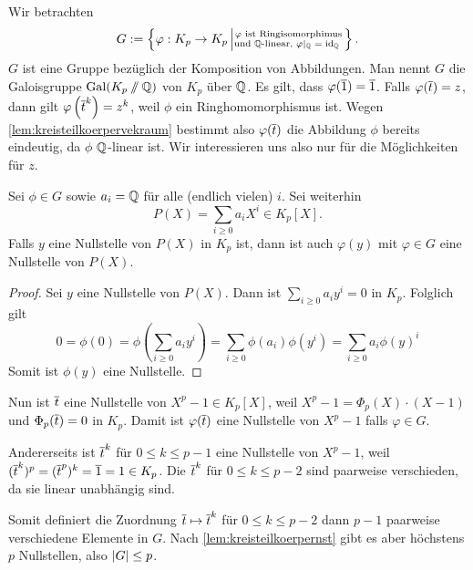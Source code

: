 \documentclass[12pt,a4paper]{scrartcl}
\begin{document}
Wir betrachten 
\begin{equation*}
	G := \left\lbrace \varphi: K_p \to K_p \left| \substack{\text{$\varphi$ ist Ringisomorphimus} \\ \text{und $\mathbb Q$-linear, $\varphi|_\mathbb Q = \operatorname{id}_\mathbb Q$ }}\right. \right\rbrace .
\end{equation*}
$G$ ist eine Gruppe bezüglich der Komposition von Abbildungen. Man nennt $G$ die Galoisgruppe $\operatorname{Gal}(K_p \sslash \mathbb Q)$ von $K_p$ über $\mathbb Q$.
Es gilt, dass $\varphi(\overline{1}) = \overline{1}$. Falls $\varphi(\overline{t}) = z$, dann gilt $\varphi\left( \overline{t} ^k \right) = z^k$, weil $\phi$ ein Ringhomomorphismus ist.
Wegen \cref{lem:kreisteilkoerpervekraum} bestimmt also $\varphi(\overline t)$ die Abbildung $\phi$ bereits eindeutig, da $\phi$ $\mathbb Q$-linear ist. Wir interessieren uns also nur für die Möglichkeiten für $z$.

\begin{lem} \label{lem:kreisteilkoerpernst}
	Sei $\phi \in G$ sowie $a_i = \mathbb Q$ für alle (endlich vielen) $i$. Sei weiterhin
	\begin{equation*}
		P(X) = \sum_{i \geq 0} a_iX^i \in K_p[X].
	\end{equation*}
	Falls $y$ eine Nullstelle von $P(X)$ in $K_p$ ist, dann ist auch $\varphi(y)$ mit $\varphi \in G$ eine Nullstelle von $P(X)$.
\end{lem}

\begin{proof}
	Sei $y$ eine Nullstelle von $P(X)$. Dann ist $\sum_{i \geq 0} a_iy^i = 0$ in $K_p$. Folglich gilt 
	$$0 = \phi(0) = \phi\left( \sum_{i \geq 0} a_iy^i \right) = \sum_{i \geq 0} \phi(a_i) \phi(y^i) = \sum_{i \geq 0} a_i \phi(y)^i$$
	Somit ist $\phi(y)$ eine Nullstelle.
\end{proof}

Nun ist $\overline t$ eine Nullstelle von $X^p-1\in K_p[X]$, weil $X^p-1=\Phi_p(X)\cdot (X-1)$ und $\Phi_p(\overline{t})=0$ in $K_p$. Damit ist $\varphi(\overline t)$ eine Nullstelle von $X^p-1$ falls $\varphi \in G$.

Andererseits ist $\overline t^k$ für $0\le k \le p-1$ eine Nullstelle von $X^p -1$, weil $(\overline t^k)^p = (\overline t ^p)^k = \overline 1 = 1 \in K_p$. Die $\overline t^k$ für $0\le k \le p-2$ sind paarweise verschieden, da sie linear unabhängig sind.

Somit definiert die Zuordnung $\overline t \mapsto \overline t^k$ für $0\le k \le p-2$ dann $p-1$ paarweise verschiedene Elemente in $G$. Nach \cref{lem:kreisteilkoerpernst} gibt es aber höchstens $p$ Nullstellen, also $\lvert G\rvert\le p$.
\end{document}
